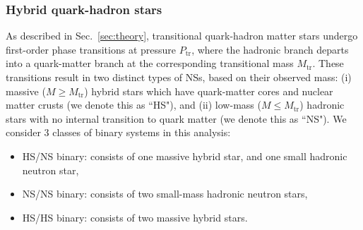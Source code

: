 \documentclass[prd,twocolumn,nofootinbib,superscriptaddress,amsmath,amssymb]{revtex4-1}
\begin{document}
\subsubsection{Hybrid quark-hadron stars}\label{sec:binLove-hybrid}
As described in Sec.~\ref{sec:theory}, transitional quark-hadron matter stars undergo first-order phase transitions at pressure $P_{\text{tr}}$, where the hadronic branch departs into a quark-matter branch at the corresponding transitional mass $M_{\text{tr}}$.
These transitions result in two distinct types of NSs, based on their observed mass: (i) massive ($M \geq M_{\text{tr}}$) hybrid stars which have quark-matter cores and nuclear matter crusts (we denote this as ``HS"), and (ii) low-mass ($M \leq M_{\text{tr}}$) hadronic stars with no internal transition to quark matter (we denote this as ``NS"). {}
{} 
We consider 3 classes of binary systems in this analysis:
\begin{itemize}
\item HS/NS binary: consists of one massive hybrid star, and one small hadronic neutron star,
\item NS/NS binary: consists of two small-mass hadronic neutron stars,
\item HS/HS binary: consists of two massive hybrid stars.
\end{itemize}
\end{document}

